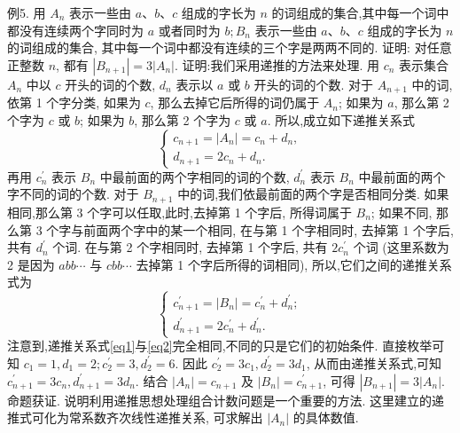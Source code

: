 例5. 用 $A_n$ 表示一些由 $a 、 b 、 c$ 组成的字长为 $n$ 的词组成的集合,其中每一个词中都没有连续两个字同时为 $a$ 或者同时为 $b ; B_n$ 表示一些由 $a 、 b 、 c$ 组成的字长为 $n$ 的词组成的集合, 其中每一个词中都没有连续的三个字是两两不同的.
证明: 对任意正整数 $n$, 都有 $\left|B_{n+1}\right|=3\left|A_n\right|$.
证明:我们采用递推的方法来处理.
用 $c_n$ 表示集合 $A_n$ 中以 $c$ 开头的词的个数, $d_n$ 表示以 $a$ 或 $b$ 开头的词的个数.
对于 $A_{n+1}$ 中的词, 依第 1 个字分类, 如果为 $c$, 那么去掉它后所得的词仍属于 $A_n$; 如果为 $a$, 那么第 2 个字为 $c$ 或 $b$; 如果为 $b$, 那么第 2 个字为 $c$ 或 $a$. 所以,成立如下递推关系式
$$
\left\{\begin{array}{l}
c_{n+1}=\left|A_n\right|=c_n+d_n, \\
d_{n+1}=2 c_n+d_n .
\end{array}\right. \label{eq1}
$$
再用 $c_n^{\prime}$ 表示 $B_n$ 中最前面的两个字相同的词的个数, $d_n^{\prime}$ 表示 $B_n$ 中最前面的两个字不同的词的个数.
对于 $B_{n+1}$ 中的词,我们依最前面的两个字是否相同分类.
如果相同,那么第 3 个字可以任取,此时,去掉第 1 个字后, 所得词属于 $B_n$; 如果不同, 那么第 3 个字与前面两个字中的某一个相同, 在与第 1 个字相同时, 去掉第 1 个字后, 共有 $d_n^{\prime}$ 个词.
在与第 2 个字相同时, 去掉第 1 个字后, 共有 $2 c_n^{\prime}$ 个词 (这里系数为 2 是因为 $a b b \cdots$ 与 $c b b \cdots$ 去掉第 1 个字后所得的词相同), 所以,它们之间的递推关系式为
$$
\left\{\begin{array}{l}
c_{n+1}^{\prime}=\left|B_n\right|=c_n^{\prime}+d_n^{\prime} ; \\
d_{n+1}^{\prime}=2 c_n^{\prime}+d_n^{\prime} .
\end{array}\right. \label{eq2}
$$
注意到,递推关系式\ref{eq1}与\ref{eq2}完全相同,不同的只是它们的初始条件.
直接枚举可知 $c_1=1, d_1=2 ; c_2^{\prime}=3, d_2^{\prime}=6$. 因此 $c_2^{\prime}=3 c_1, d_2^{\prime}=3 d_1$, 从而由递推关系式,可知 $c_{n+1}^{\prime}=3 c_n, d_{n+1}^{\prime}=3 d_n$. 结合 $\left|A_n\right|=c_{n+1}$ 及 $\left|B_n\right|=c_{n+1}^{\prime}$, 可得 $\left|B_{n+1}\right|=3\left|A_n\right|$.
命题获证.
说明利用递推思想处理组合计数问题是一个重要的方法.
这里建立的递推式可化为常系数齐次线性递推关系, 可求解出 $\left|A_n\right|$ 的具体数值.



